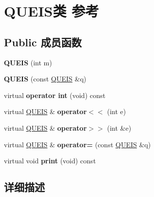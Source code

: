 \hypertarget{classQUEIS}{}\section{Q\+U\+E\+I\+S类 参考}
\label{classQUEIS}
\subsection*{Public 成员函数}
\begin{DoxyCompactItemize}
\item 
{\bfseries Q\+U\+E\+IS} (int m)\hypertarget{classQUEIS_a8eb66c1ff47e0f0aca03c563ac6e6dce}{}\label{classQUEIS_a8eb66c1ff47e0f0aca03c563ac6e6dce}

\item 
{\bfseries Q\+U\+E\+IS} (const \hyperlink{classQUEIS}{Q\+U\+E\+IS} \&q)\hypertarget{classQUEIS_ad9d0fe5e4b37f19883c5463173fd8ce6}{}\label{classQUEIS_ad9d0fe5e4b37f19883c5463173fd8ce6}

\item 
virtual {\bfseries operator int} (void) const \hypertarget{classQUEIS_a0cd5f9b0a81ad316af771078ea723873}{}\label{classQUEIS_a0cd5f9b0a81ad316af771078ea723873}

\item 
virtual \hyperlink{classQUEIS}{Q\+U\+E\+IS} \& {\bfseries operator$<$$<$} (int e)\hypertarget{classQUEIS_a6f9891ed65fb0e1127c31d1d9f2e85ee}{}\label{classQUEIS_a6f9891ed65fb0e1127c31d1d9f2e85ee}

\item 
virtual \hyperlink{classQUEIS}{Q\+U\+E\+IS} \& {\bfseries operator$>$$>$} (int \&e)\hypertarget{classQUEIS_acbf52122b69ca035a107cca9f4b73ab2}{}\label{classQUEIS_acbf52122b69ca035a107cca9f4b73ab2}

\item 
virtual \hyperlink{classQUEIS}{Q\+U\+E\+IS} \& {\bfseries operator=} (const \hyperlink{classQUEIS}{Q\+U\+E\+IS} \&q)\hypertarget{classQUEIS_a9b44dfb89316be0158361b642b7d558a}{}\label{classQUEIS_a9b44dfb89316be0158361b642b7d558a}

\item 
virtual void {\bfseries print} (void) const \hypertarget{classQUEIS_a447f31b50d9bea91fc5fc7c7aaffd68a}{}\label{classQUEIS_a447f31b50d9bea91fc5fc7c7aaffd68a}

\end{DoxyCompactItemize}


\subsection{详细描述}


